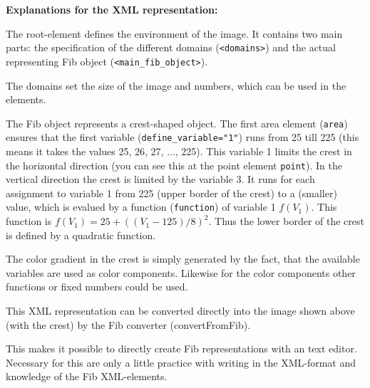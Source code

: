 \documentclass[12pt,a4paper]{article}
\begin{document}
\bigskip\noindent
\textbf{Explanations for the XML representation:}

The root-element defines the environment of the image. It contains two main parts: the specification of the different domains (\verb|<domains>|) and the actual representing Fib object (\verb|<main_fib_object>|).

The domains set the size of the image and numbers, which can be used in the elements.

The Fib object represents a crest-shaped object.
The first area element (\verb|area|) ensures that the first variable (\verb|define_variable="1"|) runs from 25 till 225 (this means it takes the values 25, 26, 27, ..., 225). This variable 1 limits the crest in the horizontal direction (you can see this at the point element \verb|point|).
In the vertical direction the crest is limited by the variable 3. It runs for each assignment to variable 1 from 225 (upper border of the crest) to a (smaller) value, which is evalued by a function (\verb|function|) of variable 1 $f(V_1)$. This function is $f(V_1) = 25 + ((V_1 - 125) / 8)^{2} $. Thus the lower border of the crest is defined by a quadratic function.

The color gradient in the crest is simply generated by the fact, that the available variables are used as color components. Likewise for the color components other functions or fixed numbers could be used.

\bigskip
This XML representation can be converted directly into the image shown above (with the crest) by the Fib converter (convertFromFib).

This makes it possible to directly create Fib representations with an text editor. Necessary for this are only a little practice with writing in the XML-format and knowledge of the Fib XML-elements.
\end{document}

